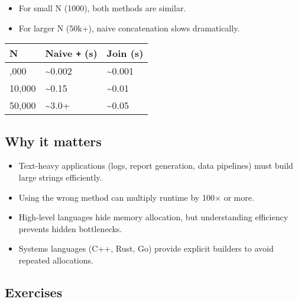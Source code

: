 \documentclass[
  letterpaper,
  DIV=11,
  numbers=noendperiod]{scrreprt}
\providecommand{\tightlist}{%
  \setlength{\itemsep}{0pt}\setlength{\parskip}{0pt}}
\begin{document}
\begin{itemize}
\tightlist
\item
  For small N (1000), both methods are similar.
\item
  For larger N (50k+), naive concatenation slows dramatically.
\end{itemize}

\begin{longtable}[]{@{}lll@{}}
\toprule\noalign{}
N & Naive \texttt{+} (s) & Join (s) \\
\midrule\noalign{}
\endhead
\bottomrule\noalign{}
\endlastfoot
1,000 & \textasciitilde0.002 & \textasciitilde0.001 \\
10,000 & \textasciitilde0.15 & \textasciitilde0.01 \\
50,000 & \textasciitilde3.0+ & \textasciitilde0.05 \\
\end{longtable}

\subsection{Why it matters}\label{why-it-matters-48}

\begin{itemize}
\tightlist
\item
  Text-heavy applications (logs, report generation, data pipelines) must
  build large strings efficiently.
\item
  Using the wrong method can multiply runtime by 100× or more.
\item
  High-level languages hide memory allocation, but understanding
  efficiency prevents hidden bottlenecks.
\item
  Systems languages (C++, Rust, Go) provide explicit builders to avoid
  repeated allocations.
\end{itemize}

\subsection{Exercises}\label{exercises-47}
\end{document}
